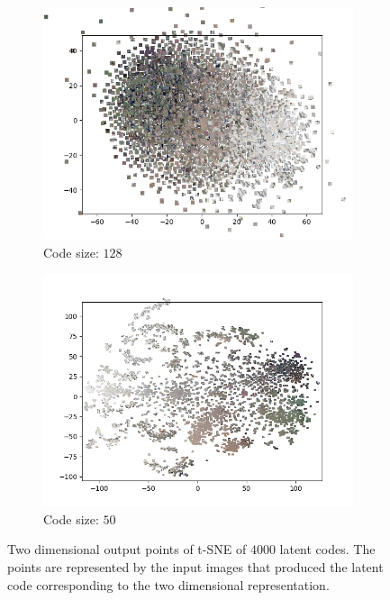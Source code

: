 \begin{figure}[H]
\begin{subfigure}{.5\textwidth}
        \centering
        \includegraphics[width=\textwidth]{images/figures/experiments_latent/pooling_dim1024_images.png}   
        \caption{Code size: $128$}
    \end{subfigure}%
    \begin{subfigure}{.5\textwidth}
        \centering
        \includegraphics[width=\textwidth]{images/figures/experiments_latent/pooling_dim50_images.png}
        \caption{Code size: $50$}
    \end{subfigure}
    \caption{Two dimensional output points of t-SNE of $4000$ latent codes. The points are represented by the input
    images that produced the latent code corresponding to the two dimensional representation.}
\end{figure} \label{figure_images_pooling_PCA}
